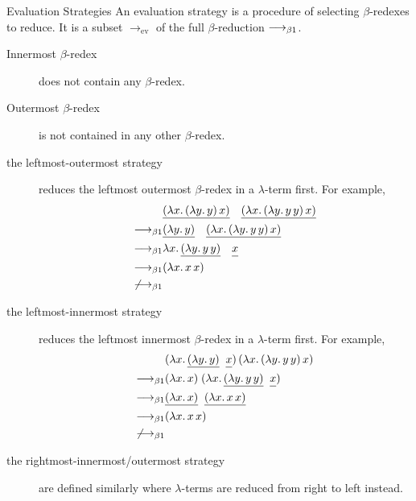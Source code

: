 \begin{frame}[allowframebreaks]{Evaluation Strategies}
An evaluation strategy is a procedure of selecting $\beta$-redexes
to reduce. It is a subset $\longrightarrow_{\mathrm{ev}}$ of the full
$\beta$-reduction $\longrightarrow_{\beta1}$.

\begin{description}
  \item[Innermost $\beta$-redex] does not contain any $\beta$-redex.
  \item[Outermost $\beta$-redex] is not contained in any other $\beta$-redex.
\end{description}

\begin{description}
  \item[the leftmost-outermost strategy] reduces the leftmost outermost
    $\beta$-redex in a $\lambda$-term first. For example, 
    \begin{align*}
      & 
      \underline{(\lambda x.\, (\lambda y.\, y)\,x)}\quad
      \underline{(\lambda x.\, (\lambda y.\, y\,y)\,x)}
      \\
      \longrightarrow_{\beta1} &
      \underline{(\lambda y.\, y)}\quad
      \underline{(\lambda x.\, (\lambda y.\, y\,y)\, x)} \\
      \longrightarrow_{\beta1} &
      \lambda x.\, \underline{(\lambda y.\, y\,y)}\quad
      \underline{\vphantom{(\lambda}x} \\
      \longrightarrow_{\beta1} & (\lambda x.\, x\,x) \\
      \not\longrightarrow_{\beta1}
    \end{align*}
  \item[the leftmost-innermost strategy] reduces the leftmost innermost
    $\beta$-redex in a $\lambda$-term first. For example, 
    \begin{align*}
      & (\lambda x.\, \underline{(\lambda y.\,
        y)}\;\;\underline{\vphantom{(\lambda} x})\,
      (\lambda x.\, (\lambda y.\, y\, y)\,x) \\
      \longrightarrow_{\beta1} & (\lambda x.\,x)\;
      (\lambda x.\, \underline{(\lambda y.\, y\,
        y)}\;\;\underline{\vphantom{(\lambda}x}) \\
      \longrightarrow_{\beta1} & \underline{(\lambda x.\,x)}\;\;\underline{(\lambda x.\, x\,x)} \\
      \longrightarrow_{\beta1} & (\lambda x.\, x\, x) \\
      \not\longrightarrow_{\beta1}
    \end{align*}
  \item[the rightmost-innermost/outermost strategy]
    are defined similarly where $\lambda$-terms are reduced from right to left
    instead.
\end{description}
\end{frame}

